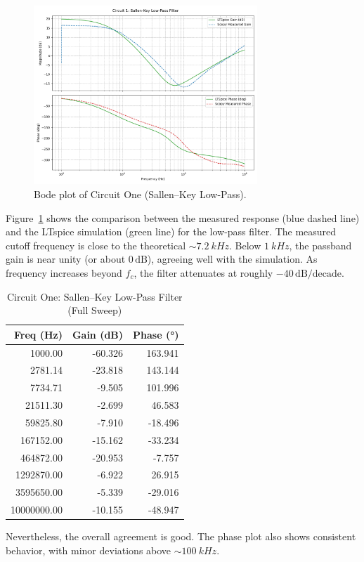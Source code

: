 \documentclass[12pt]{article}
\begin{document}
\begin{figure}[H]
	\centering
	\includegraphics[width=0.75\textwidth]{07_bode1}
	\caption{Bode plot of Circuit One (Sallen--Key Low-Pass).}
	\label{fig:bode1}
\end{figure}

Figure~\ref{fig:bode1} shows the comparison between the measured response (blue
dashed line) and the LTspice simulation (green line) for the low-pass filter.
The measured cutoff frequency is close to the theoretical $\sim\SI{7.2}{kHz}$.
Below $\SI{1}{kHz}$, the passband gain is near unity (or about $0\,\mathrm{dB}$),
agreeing well with the simulation. As frequency increases beyond $f_c$, the
filter attenuates at roughly $-40\,\mathrm{dB/decade}$.

\begin{table}[H]
\centering
\begin{tabular}{|r|r|r|}
\hline
\textbf{Freq (Hz)} & \textbf{Gain (dB)} & \textbf{Phase (°)} \\
\hline
1000.00   & -60.326 & 163.941 \\
2781.14   & -23.818 & 143.144 \\
7734.71   &  -9.505 & 101.996 \\
21511.30  &  -2.699 &  46.583 \\
59825.80  &  -7.910 & -18.496 \\
167152.00 & -15.162 & -33.234 \\
464872.00 & -20.953 &  -7.757 \\
1292870.00 & -6.922 &  26.915 \\
3595650.00 & -5.339 & -29.016 \\
10000000.00 & -10.155 & -48.947 \\
\hline
\end{tabular}
\caption{Circuit One: Sallen--Key Low-Pass Filter (Full Sweep)}
\label{tab:C1_LPF_full}
\end{table}
Nevertheless, the overall agreement is good. The phase plot also shows
consistent behavior, with minor deviations above $\sim\SI{100}{kHz}$.
\end{document}

